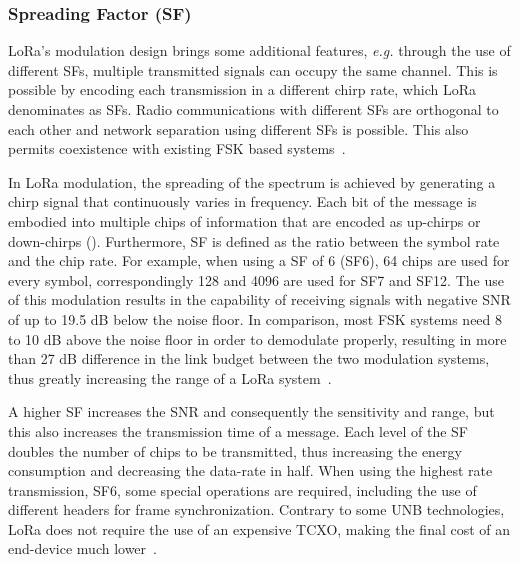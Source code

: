 \subsubsection{Spreading Factor (SF)}
\ac{LoRa}'s modulation design brings some additional features, \emph{e.g.} through the use of different \acp{SF}, multiple transmitted signals can occupy the same channel.
This is possible by encoding each transmission in a different chirp rate, which LoRa denominates as \acp{SF}.
Radio communications with different \acp{SF} are orthogonal to each other and network separation using different \acp{SF} is possible.
This also permits coexistence with existing \ac{FSK} based systems~\cite{Bor,LoRaWANSpec}.

In \ac{LoRa} modulation, the spreading of the spectrum is achieved by generating a chirp signal that continuously varies in frequency.
Each bit of the message is embodied into multiple chips of information that are encoded as up-chirps or down-chirps ().
Furthermore, \ac{SF} is defined as the ratio between the symbol rate and the chip rate.
For example, when using a \ac{SF} of 6 (SF6), 64 chips are used for every symbol, correspondingly 128 and 4096 are used for SF7 and SF12.
The use of this modulation results in the capability of receiving signals with negative \ac{SNR} of up to 19.5 dB below the noise floor.
In comparison, most \ac{FSK} systems need 8 to 10 dB above the noise floor in order to demodulate properly, resulting in more than 27 dB difference in the link budget between the two modulation systems, thus greatly increasing the range of a \ac{LoRa} system~\cite{SX1276,SX1301}.

A higher \ac{SF} increases the \ac{SNR} and consequently the sensitivity and range, but this also increases the transmission time of a message.
Each level of the \ac{SF} doubles the number of chips to be transmitted, thus increasing the energy consumption and decreasing the data-rate in half.
When using the highest rate transmission, SF6, some special operations are required, including the use of different headers for frame synchronization.
Contrary to some \ac{UNB} technologies, \ac{LoRa} does not require the use of an expensive \ac{TCXO}, making the final cost of an end-device much lower~\cite{SX1276}.



